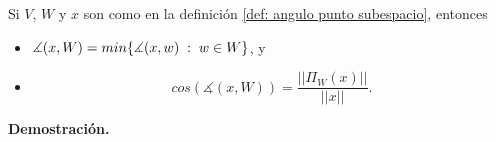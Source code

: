 \begin{prop}
\label{prop: algunos hechos sobre el angulo entre un vector y un subespacio}
Si $V$, $W$ y $x$ son como en la definición 
\ref{def: angulo punto subespacio}, entonces

\begin{itemize}
\item 
$\measuredangle (x, W) = min \{ \measuredangle(x,w) \hspace{0.1cm} :
 \hspace{0.1cm} w \in W \}$, y

\item 
\begin{equation}
\label{eq: coseno a subespacio}
cos \left( \measuredangle (x, W) \right) = \frac{|| \Pi_{W}(x) ||}{||x||}.
\end{equation}
\end{itemize}


\end{prop}
\noindent
\textbf{Demostración.}
